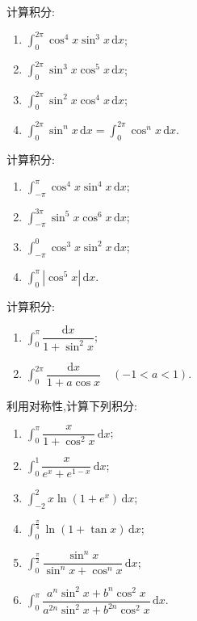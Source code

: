 \documentclass[../数学分析培优讲义.tex]{subfiles}
\begin{document}
\begin{example}
计算积分:
\begin{enumerate}[label=(\arabic*)]
    \item $\displaystyle\int_0^{2\pi}\cos^4x\sin^3x\,\mathrm{d}x$;
    \item $\displaystyle\int_0^{2\pi}\sin^3x\cos^5x\,\mathrm{d}x$;
    \item $\displaystyle\int_0^{2\pi}\sin^2x\cos^4x\,\mathrm{d}x$;
    \item $\displaystyle\int_0^{2\pi}\sin^n x\,\mathrm{d}x
    =\int_0^{2\pi}\cos^n x\,\mathrm{d}x$.
\end{enumerate}
\end{example}
\exampleblank

\begin{example}
计算积分:
\begin{enumerate}[label=(\arabic*)]
    \item $\displaystyle\int_{-\pi}^{\pi}\cos^4x\sin^4x\,\mathrm{d}x$;
    \item $\displaystyle\int_{-\pi}^{3\pi}\sin^5x\cos^6x\,\mathrm{d}x$;
    \item $\displaystyle\int_{-\pi}^{0}\cos^3x\sin^2x\,\mathrm{d}x$;
    \item $\displaystyle\int_0^\pi|\cos^5x|\,\mathrm{d}x$.
\end{enumerate}
\end{example}
\exampleblank

\begin{example}
计算积分:
\begin{enumerate}[label=(\arabic*)]
    \item $\displaystyle\int_0^\pi\dfrac{\mathrm{d}x}{1+\sin^2x}$;
    \item $\displaystyle\int_0^{2\pi}\dfrac{\mathrm{d}x}{1+a\cos x}\quad(-1<a<1)$.
\end{enumerate}
\end{example}
\exampleblank

\begin{example}
利用对称性,计算下列积分:
\begin{enumerate}[label=(\arabic*)]
    \item $\displaystyle\int_0^\pi\dfrac{x}{1+\cos^2x}\,\mathrm{d}x$;
    \item $\displaystyle\int_0^1\dfrac{x}{e^x+e^{1-x}}\,\mathrm{d}x$;
    \item $\displaystyle\int_{-2}^{2}x\ln(1+e^x)\,\mathrm{d}x$;
    \item $\displaystyle\int_0^{\frac{\pi}{4}}\ln(1+\tan x)\,\mathrm{d}x$;
    \item $\displaystyle\int_0^{\frac{\pi}{2}}\dfrac{\sin^n x}{\sin^n x+\cos^n x}\,\mathrm{d}x$;
    \item $\displaystyle\int_0^\pi
    \dfrac{a^n\sin^2x+b^n\cos^2x}{a^{2n}\sin^2x+b^{2n}\cos^2x}\,\mathrm{d}x$.
\end{enumerate}
\end{example}
\exampleblank
\end{document}
